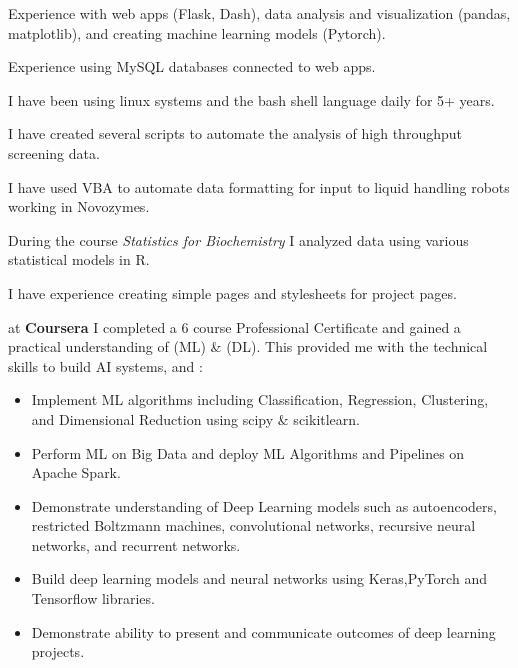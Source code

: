 \documentclass{cleancv}
\begin{document}
\makeheader


\begin{rightsection}

  \begin{itskills}
    {%
      Experience with web apps (Flask, Dash), data analysis and
      visualization (pandas, matplotlib), and creating machine
      learning models (Pytorch).%
    }

    {%
      Experience using MySQL databases connected to web apps.%
    }

    {I have been using linux systems and the bash shell language daily
      for 5+ years.%
    }
    
    {
      I have created several scripts to automate the analysis of high
      throughput screening data.%
    }
    
    {
      I have used VBA to automate data formatting for input to
      liquid handling robots working in Novozymes.%
     }
    
    {
      During the course \emph{Statistics for Biochemistry} I analyzed
      data using various statistical models in R.%
    }
    
    {%
      I have experience creating simple pages and
      stylesheets for project pages.%
    }
    
  \end{itskills}
  
  \begin{certificates}
    {%
      at \textbf{Coursera}\vspace{0.5ex}\newline
      I completed a 6 course Professional Certificate and gained a
      practical understanding of 
      (ML) \&  (DL). This provided me
      with the technical skills to build AI systems,
      and :
      \begin{itemize}
      \item Implement ML algorithms including Classification,
        Regression, Clustering, and Dimensional Reduction using scipy
        \& scikitlearn.
      \item Perform ML on Big Data and deploy ML Algorithms and
        Pipelines on Apache Spark.
      \item Demonstrate understanding of Deep Learning models such as
        autoencoders, restricted Boltzmann machines,
        convolutional networks, recursive neural networks, and
        recurrent networks.
    \item Build deep learning models and neural networks using
      Keras,PyTorch and Tensorflow libraries.
    \item Demonstrate ability to present and communicate outcomes of
      deep learning projects.
    \end{itemize}

}
\end{certificates}
\end{rightsection}
\end{document}
